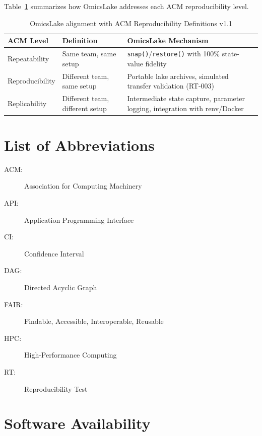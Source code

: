 \documentclass[11pt,a4paper]{article}
\begin{document}
Table~\ref{tab:acm_alignment} summarizes how OmicsLake addresses each ACM reproducibility level.

\begin{table}[H]
\centering
\caption{OmicsLake alignment with ACM Reproducibility Definitions v1.1}
\label{tab:acm_alignment}
\begin{tabular}{lp{4cm}p{6cm}}
\toprule
\textbf{ACM Level} & \textbf{Definition} & \textbf{OmicsLake Mechanism} \\
\midrule
Repeatability & Same team, same setup & \texttt{snap()}/\texttt{restore()} with 100\% state-value fidelity \\
Reproducibility & Different team, same setup & Portable lake archives, simulated transfer validation (RT-003) \\
Replicability & Different team, different setup & Intermediate state capture, parameter logging, integration with renv/Docker \\
\bottomrule
\end{tabular}
\end{table}

\section{List of Abbreviations}

\begin{description}
    \item[ACM:] Association for Computing Machinery
    \item[API:] Application Programming Interface
    \item[CI:] Confidence Interval
    \item[DAG:] Directed Acyclic Graph
    \item[FAIR:] Findable, Accessible, Interoperable, Reusable
    \item[HPC:] High-Performance Computing
    \item[RT:] Reproducibility Test
\end{description}

\section{Software Availability}
\end{document}
